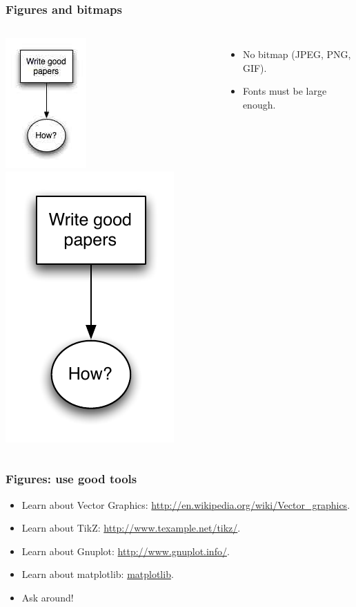 \documentclass[handout]{beamer}
\begin{document}
\frame
{
  \frametitle{Figures and bitmaps}
  \begin{columns}
 \column{3.5cm}
  \includegraphics{badbitmap.jpg}
 \column{3.5cm}
  \includegraphics{badbitmap.pdf}
 \column{7cm}
  \begin{itemize}
  \item<1->  No bitmap (JPEG, PNG, GIF).
  \item<2->   Fonts must be large enough.
  \end{itemize}
 \end{columns}

 }



\frame
{
  \frametitle{Figures: use good tools}

    \begin{itemize}
  \item<1->  Learn about Vector Graphics: \url{http://en.wikipedia.org/wiki/Vector_graphics}.
  \item<2->  Learn about TikZ: \url{http://www.texample.net/tikz/}.
  \item<3->  Learn about Gnuplot: \url{http://www.gnuplot.info/}.
  \item<4->  Learn about matplotlib: \url{matplotlib}.
  \item<5-> Ask around!
  \end{itemize}
 }
\end{document}
